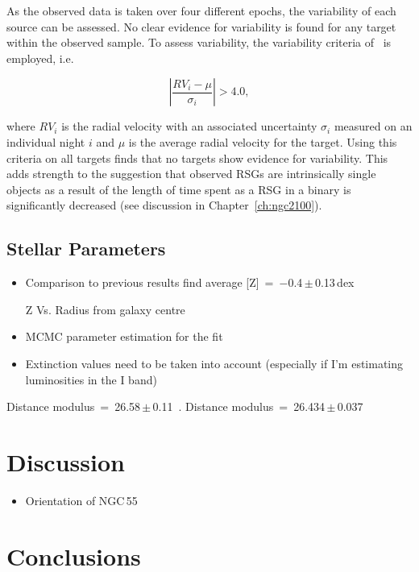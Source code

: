As the observed data is taken over four different epochs, the variability of each source can be assessed. No clear evidence for variability is found for any target within the observed sample.
To assess variability, the variability criteria of~\citep{2012A&A...546A..73H} is employed, i.e.

\begin{equation}
  \left|\frac{RV_i - \mu}{\sigma_i}\right| > 4.0,\label{eq:vary}
\end{equation}

\noindent where $RV_i$ is the radial velocity with an associated uncertainty  $\sigma_i$ measured on an individual night $i$ and $\mu$ is the average radial velocity for the target.
Using this criteria on all targets finds that no targets show evidence for variability.
This adds strength to the suggestion that observed RSGs are intrinsically single objects as a result of the length of time spent as a RSG in a binary is significantly decreased (see discussion in Chapter~\ref{ch:ngc2100}).


\subsection{Stellar Parameters} %
\label{sub:stellar_parameters}


\begin{itemize}
    \item Comparison to previous results
    \cite{2012A&A...542A..79C} find average [Z]~=~$-$0.4\,$\pm$\,0.13\,dex
    \item [Z] Vs. Radius from galaxy centre
    \item MCMC parameter estimation for the fit
    \item Extinction values need to be taken into account (especially if I'm estimating luminosities in the I band)
    \end{itemize}

Distance modulus~=~26.58\,$\pm$\,0.11~\citep{2011ApJ...738..150T}.
Distance modulus~=~26.434\,$\pm$\,0.037~\citep{2008ApJ...672..266G}



\section{Discussion} %
\label{sec:ngc55disc}

\begin{itemize}
    \item Orientation of NGC\,55
\end{itemize}

\section{Conclusions} %
\label{sec:ngc55conc}


